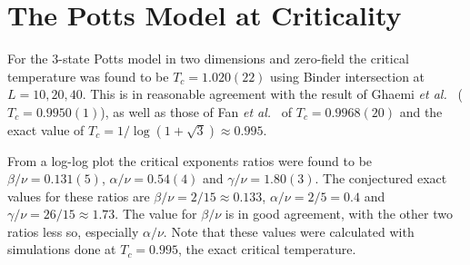\documentclass[11pt, a4paper]{report} %
\begin{document}
\section{The Potts Model at Criticality}

For the 3-state Potts model in two dimensions and zero-field the critical temperature was found to be \(T_c=1.020(22)\) using Binder intersection at \(L = 10, 20, 40\).
This is in reasonable agreement with the result of Ghaemi \textit{et al.}~\cite{ghaemi:2001} (\(T_c=0.9950(1)\)), as well as those of Fan \textit{et al.}~\cite{fan:2007} of \(T_c = 0.9968(20)\) and the exact value of \(T_c = 1/\log(1+\sqrt{3}) \approx 0.995\).

From a log-log plot the critical exponents ratios were found to be \(\beta/\nu = 0.131(5)\), \(\alpha/\nu = 0.54(4)\) and \(\gamma/\nu = 1.80(3)\).
The conjectured exact values for these ratios are \(\beta/\nu = 2/15 \approx 0.133\), \(\alpha/\nu = 2/5 =0.4\) and \(\gamma/\nu = 26/15 \approx 1.73\).
The value for \(\beta/\nu\) is in good agreement, with the other two ratios less so, especially \(\alpha/\nu\).
Note that these values were calculated with simulations done at \(T_c=0.995\), the exact critical temperature.
\end{document}
